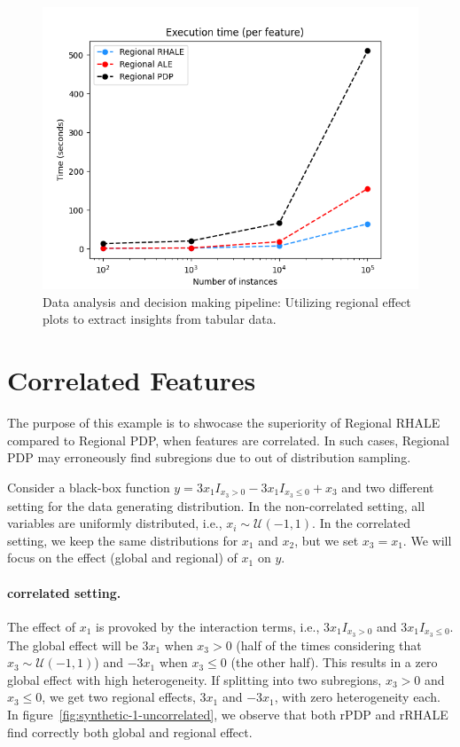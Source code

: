 \documentclass[
twocolumn,
]{ceurart}
\begin{document}
\begin{figure}
    \centering
    \includegraphics[width=.49\textwidth]{figures/simulation_2/efficiency_samples.png}
    \caption{Data analysis and decision making pipeline: Utilizing regional effect plots to extract insights from tabular data.}
    \label{fig:efficiency_nof_instances}
\end{figure}


\section{Correlated Features}

The purpose of this example is to shwocase the superiority of Regional RHALE compared to Regional PDP, when features are correlated. In such cases, Regional PDP may erroneously find subregions due to out of distribution sampling.

Consider a black-box function $y = 3x_1I_{x_3>0} - 3x_1I_{x_3\leq0} + x_3$ and two different setting for the data generating distribution. In the non-correlated setting, all variables are uniformly distributed, i.e., $x_i \sim \mathcal{U}(-1,1)$.
In the correlated setting, we keep the same distributions for $x_1$ and $x_2$, but we set $x_3 = x_1$. We will focus on the effect (global and regional) of $x_1$ on $y$.

\paragraph{correlated setting.}

The effect of $x_1$ is provoked by the interaction terms, i.e., $3x_1I_{x_3>0}$ and $3x_1I_{x_3\leq0}$. The global effect will be $3x_1$ when $x_3>0$ (half of the times considering that $x_3 \sim \mathcal{U}(-1,1)$) and $-3x_1$ when $x_3 \leq 0$ (the other half). This results in a zero global effect with high heterogeneity. If splitting into two subregions, $x_3>0$ and $x_3 \leq 0$, we get two regional effects, $3x_1$ and $-3x_1$, with zero heterogeneity each. In figure~\ref{fig:synthetic-1-uncorrelated}, we observe that both rPDP and rRHALE find correctly both global and regional effect.
\end{document}
